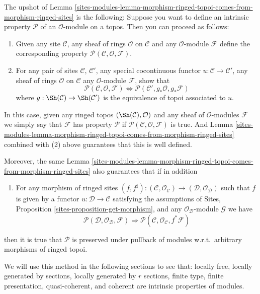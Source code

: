 \medskip\noindent
The upshot of
Lemma \ref{sites-modules-lemma-morphism-ringed-topoi-comes-from-morphism-ringed-sites}
is the following: Suppose you want to define
an intrinsic property $\mathcal{P}$ of an $\mathcal{O}$-module on a
topos. Then you can proceed as follows:
\begin{enumerate}
\item Given any site $\mathcal{C}$, any sheaf of rings $\mathcal{O}$
on $\mathcal{C}$ and any $\mathcal{O}$-module $\mathcal{F}$
define the corresponding
property $\mathcal{P}(\mathcal{C}, \mathcal{O}, \mathcal{F})$.
\item For any pair of sites $\mathcal{C}$, $\mathcal{C}'$, any
special cocontinuous functor $u : \mathcal{C} \to \mathcal{C}'$,
any sheaf of rings $\mathcal{O}$ on $\mathcal{C}$ any
$\mathcal{O}$-module $\mathcal{F}$, show that
$$
\mathcal{P}(\mathcal{C}, \mathcal{O}, \mathcal{F})
\Leftrightarrow
\mathcal{P}(\mathcal{C}', g_*\mathcal{O}, g_*\mathcal{F})
$$
where $g : \Sh(\mathcal{C}) \to \Sh(\mathcal{C}')$
is the equivalence of topoi associated to $u$.
\end{enumerate}
In this case, given any ringed topos $(\Sh(\mathcal{C}), \mathcal{O})$
and any sheaf of $\mathcal{O}$-modules $\mathcal{F}$ we simply say that
$\mathcal{F}$ has property $\mathcal{P}$ if
$\mathcal{P}(\mathcal{C}, \mathcal{O}, \mathcal{F})$ is true.
And Lemma \ref{sites-modules-lemma-morphism-ringed-topoi-comes-from-morphism-ringed-sites}
combined with (2) above guarantees that this is well defined.

\medskip\noindent
Moreover, the same
Lemma \ref{sites-modules-lemma-morphism-ringed-topoi-comes-from-morphism-ringed-sites}
also guarantees that if in addition
\begin{enumerate}
\item[(3)] For any morphism of ringed sites
$(f, f^\sharp) :
(\mathcal{C}, \mathcal{O}_\mathcal{C})
\to
(\mathcal{D}, \mathcal{O}_\mathcal{D})$
such that $f$ is given by a functor
$u : \mathcal{D} \to \mathcal{C}$ satisfying the
assumptions of Sites, Proposition \ref{sites-proposition-get-morphism},
and any $\mathcal{O}_\mathcal{D}$-module $\mathcal{G}$
we have
$$
\mathcal{P}(\mathcal{D}, \mathcal{O}_\mathcal{D}, \mathcal{F})
\Rightarrow
\mathcal{P}(\mathcal{C}, \mathcal{O}_\mathcal{C}, f^*\mathcal{F})
$$
\end{enumerate}
then it is true that $\mathcal{P}$ is preserved under pullback
of modules w.r.t.\ arbitrary morphisms of ringed topoi.

\medskip\noindent
We will use this method in the following sections to see
that:
locally free,
locally generated by sections,
locally generated by $r$ sections,
finite type,
finite presentation,
quasi-coherent, and
coherent
are intrinsic properties of modules.

